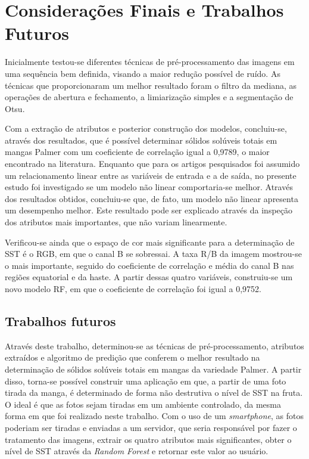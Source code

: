 \chapter{Considerações Finais e Trabalhos Futuros}

Inicialmente testou-se diferentes técnicas de pré-processamento das imagens em uma sequência bem definida, visando a maior redução possível de ruído. As técnicas que proporcionaram um melhor resultado foram o filtro da mediana, as operações de abertura e fechamento, a limiarização simples e a segmentação de Otsu.

Com a extração de atributos e posterior construção dos modelos, concluiu-se, através dos resultados, que é possível determinar sólidos solúveis totais em mangas Palmer com um coeficiente de correlação igual a 0,9789, o maior encontrado na literatura. Enquanto que para os artigos pesquisados foi assumido um relacionamento linear entre as variáveis de entrada e a de saída, no presente estudo foi investigado se um modelo não linear comportaria-se melhor. Através dos resultados obtidos, concluiu-se que, de fato, um modelo não linear apresenta um desempenho melhor. Este resultado pode ser explicado através da inspeção dos atributos mais importantes, que não variam linearmente.

Verificou-se ainda que o espaço de cor mais significante para a determinação de SST é o RGB, em que o canal B se sobressai. A taxa R/B da imagem mostrou-se o mais importante, seguido do coeficiente de correlação e média do canal B nas regiões equatorial e da haste. A partir dessas quatro variáveis, construiu-se um novo modelo RF, em que o coeficiente de correlação foi igual a 0,9752.  
 
\section{Trabalhos futuros}

Através deste trabalho, determinou-se as técnicas de pré-processamento, atributos extraídos e algoritmo de predição que conferem o melhor resultado na determinação de sólidos solúveis totais em mangas da variedade Palmer. A partir disso, torna-se possível construir uma aplicação em que, a partir de uma foto tirada da manga, é determinado de forma não destrutiva o nível de SST na fruta. O ideal é que as fotos sejam tiradas em um ambiente controlado, da mesma forma em que foi realizado neste trabalho. Com o uso de um \textit{smartphone}, as fotos poderiam ser tiradas e enviadas a um servidor, que seria responsável por fazer o tratamento das imagens, extrair os quatro atributos mais significantes, obter o nível de SST através da \textit{Random Forest} e retornar este valor ao usuário.  

